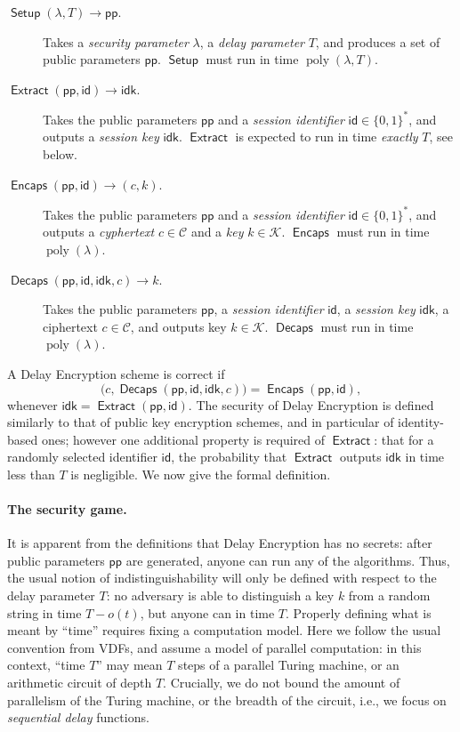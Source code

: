 \documentclass{llncs}
\DeclareMathOperator{\poly}{poly}
\DeclareMathOperator{\Setup}{\mathsf{Setup}}
\DeclareMathOperator{\Extract}{\mathsf{Extract}}
\DeclareMathOperator{\Encaps}{\mathsf{Encaps}}
\DeclareMathOperator{\Decaps}{\mathsf{Decaps}}
\newcommand{\pp}{\mathsf{pp}}
\newcommand{\id}{\mathsf{id}}
\newcommand{\idk}{\mathsf{idk}}
\newcommand{\keyspace}{\mathcal{K}}
\newcommand{\cipherspace}{\mathcal{C}}
\begin{document}
\begin{description}
\item[$\Setup(\lambda, T) \to \pp$.] %
  Takes a \emph{security parameter} $\lambda$, a \emph{delay
    parameter} $T$, and produces a set of public parameters $\pp$. %
  $\Setup$ must run in time $\poly(\lambda,T)$.
\item[$\Extract(\pp,\id) \to \idk$.] %
  Takes the public parameters $\pp$ and a \emph{session identifier}
  $\id\in\{0,1\}^*$, and outputs a \emph{session key} $\idk$. %
  $\Extract$ is expected to run in time \emph{exactly} $T$, see below.
\item[$\Encaps(\pp,\id)\to (c,k)$.] %
  Takes the public parameters $\pp$ and a \emph{session identifier}
  $\id\in\{0,1\}^*$, and outputs a \emph{cyphertext}
  $c\in\cipherspace$ and a \emph{key} $k\in\keyspace$. %
  $\Encaps$ must run in time $\poly(\lambda)$.
\item[$\Decaps(\pp,\id,\idk,c)\to k$.] %
  Takes the public parameters $\pp$, a \emph{session identifier}
  $\id$, a \emph{session key} $\idk$, a ciphertext $c\in\cipherspace$,
  and outputs key $k\in\keyspace$. %
  $\Decaps$ must run in time $\poly(\lambda)$.
\end{description}

A Delay Encryption scheme is correct if
\[\bigl(c,\Decaps(\pp,\id,\idk,c)\bigr) = \Encaps(\pp,\id),\]
whenever $\idk=\Extract(\pp,\id)$. %
The security of Delay Encryption is defined similarly to that of
public key encryption schemes, and in particular of identity-based
ones; however one additional property is required of $\Extract$: that
for a randomly selected identifier $\id$, the probability that
$\Extract$ outputs $\idk$ in time less than $T$ is negligible. %
We now give the formal definition.

\paragraph{The security game.} It is apparent from the definitions
that Delay Encryption has no secrets: after public parameters $\pp$
are generated, anyone can run any of the algorithms. %
Thus, the usual notion of indistinguishability will only be defined
with respect to the delay parameter $T$: no adversary is able to
distinguish a key $k$ from a random string in time $T-o(t)$, but
anyone can in time $T$. %
Properly defining what is meant by ``time'' requires fixing a
computation model. %
Here we follow the usual convention from VDFs, and assume a model of
parallel computation: in this context, ``time $T$'' may mean $T$ steps
of a parallel Turing machine, or an arithmetic circuit of depth $T$. %
Crucially, we do not bound the amount of parallelism of the Turing
machine, or the breadth of the circuit, i.e., we focus on
\emph{sequential delay} functions.
\end{document}
